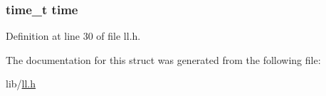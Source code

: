 \subsubsection[{time}]{\setlength{\rightskip}{0pt plus 5cm}time\+\_\+t time}\label{structd__stat_ab842bdb7d02be824fb48613032b4ff36}


Definition at line 30 of file ll.\+h.



The documentation for this struct was generated from the following file\+:\begin{DoxyCompactItemize}
\item 
lib/\hyperlink{ll_8h}{ll.\+h}\end{DoxyCompactItemize}
